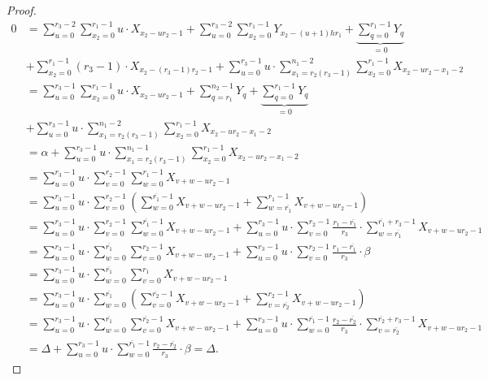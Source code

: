 \documentclass[12pt,a4paper]{article}
\theoremstyle{definition}
\newcommand{\uo}{\overline{r_2}}
\newcommand{\vo}{\overline{r_1}}
\begin{document}
\begin{proof}
\begin{align*}
0&=\sum_{u=0}^{r_3-2} \sum _{x_2=0}^{r_1-1} u\cdot X_{x_2-ur_2-1}+\sum_{u=0}^{r_3-2} \sum _{x_2=0}^{r_1-1} Y_{x_2-(u+1)hr_1}+\underbrace{\sum_{q=0}^{r_1-1}Y_{q}}_{=0}\\
&+\sum_{x_2=0}^{r_1-1}(r_3-1)\cdot X_{x_2-(r_3-1)r_2-1}+\sum_{u=0}^{r_3-1}u\cdot \sum_{x_1=r_2(r_3-1)}^{n_1-2}\sum _{x_2=0}^{r_1-1}X_{x_2-ur_2-x_1-2}\\
&=\sum_{u=0}^{r_3-1} \sum _{x_2=0}^{r_1-1} u\cdot X_{x_2-ur_2-1}+\sum_{q=r_1}^{n_2-1} Y_{q}+\underbrace{\sum_{q=0}^{r_1-1}Y_{q}}_{=0}\\
&+\sum_{u=0}^{r_3-1}u\cdot \sum_{x_1=r_2(r_3-1)}^{n_1-2}\sum _{x_2=0}^{r_1-1}X_{x_2-ur_2-x_1-2}\\
&=\alpha+\sum_{u=0}^{r_3-1}u\cdot \sum_{x_1=r_2(r_3-1)}^{n_1-1}\sum _{x_2=0}^{r_1-1}X_{x_2-ur_2-x_1-2}\\
&=\sum_{u=0}^{r_3-1}u\cdot \sum_{v=0}^{r_2-1}\sum _{w=0}^{r_1-1}X_{v+w-ur_2-1}\\
&=\sum_{u=0}^{r_3-1}u\cdot \sum_{v=0}^{r_2-1}\left(\sum _{w=0}^{\vo-1}X_{v+w-ur_2-1}+\sum _{w=\vo}^{r_1-1}X_{v+w-ur_2-1}\right)\\
&=\sum_{u=0}^{r_3-1}u\cdot \sum_{v=0}^{r_2-1}\sum _{w=0}^{\vo-1}X_{v+w-ur_2-1}+\sum_{u=0}^{r_3-1}u\cdot \sum_{v=0}^{r_2-1}\frac{r_1-\vo}{r_3}\cdot\sum _{w=\vo}^{\vo + r_3-1}X_{v+w-ur_2-1}\\
&=\sum_{u=0}^{r_3-1}u\cdot \sum _{w=0}^{\vo} \sum_{v=0}^{r_2-1} X_{v+w-ur_2-1}+\sum_{u=0}^{r_3-1}u\cdot \sum_{v=0}^{r_2-1}\frac{r_1-\vo}{r_3}\cdot \beta\\
&=\sum_{u=0}^{r_3-1}u\cdot \sum _{w=0}^{\vo} \sum_{v=0}^{r_1} X_{v+w-ur_2-1}\\
&=\sum_{u=0}^{r_3-1}u\cdot \sum _{w=0}^{\vo}\left( \sum_{v=0}^{\uo-1} X_{v+w-ur_2-1}+\sum_{v=\uo}^{r_2-1} X_{v+w-ur_2-1}\right)\\
&=\sum_{u=0}^{r_3-1}u\cdot \sum _{w=0}^{\vo} \sum_{v=0}^{\uo-1} X_{v+w-ur_2-1}+\sum_{u=0}^{r_3-1}u\cdot \sum _{w=0}^{\vo-1}\frac{r_2-\uo}{r_3}\cdot \sum_{v=\uo}^{\uo+r_3-1} X_{v+w-ur_2-1}\\
&=\Delta+\sum_{u=0}^{r_3-1}u\cdot \sum _{w=0}^{\vo-1}\frac{r_2-\uo}{r_3}\cdot \beta=\Delta.
\end{align*}

\end{proof}
\end{document}
